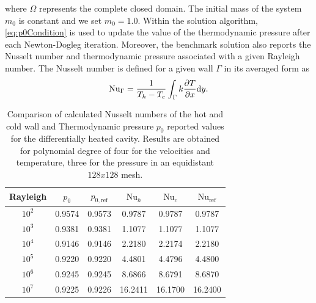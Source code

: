 where $\Omega$ represents the complete closed domain. The initial mass of the system $m_0$ is constant and we set $m_0 = 1.0$. Within the solution algorithm, \cref{eq:p0Condition} is used to update the value of the thermodynamic pressure after each Newton-Dogleg iteration.
Moreover, the benchmark solution \cite{vierendeelsBenchmarkSolutionsNatural2003} also reports the Nusselt number and thermodynamic pressure associated with a given Rayleigh number. The Nusselt number is defined for a given wall $\Gamma$ in its averaged form as 
\begin{equation}\label{eq:Nusselt}
\text{Nu}_\Gamma = \frac{1}{T_h - T_c}\int_{\Gamma} k \frac{\partial T}{\partial x}\text{d}y.
\end{equation}\begin{table}[t]
	\begin{center}
		\begin{tabular}{cccccc}
			\hline
			Rayleigh & $p_0$ &  $p_{0,\text{ref}}$  &$\text{Nu}_{h}$ & $\text{Nu}_{c}$& $\text{Nu}_{\text{ref}}$ \\ \hline
			\parbox[0pt][13pt][c]{0pt}{}$10^2$   & 0.9574 & 0.9573 & 0.9787    & 0.9787 & 0.9787      \\
			$10^3$   & 0.9381 & 0.9381 & 1.1077    & 1.1077  & 1.1077      \\
			$10^4$   & 0.9146 & 0.9146 & 2.2180    & 2.2174  & 2.2180      \\
			$10^5$   & 0.9220 & 0.9220 & 4.4801    & 4.4796   & 4.4800      \\
			$10^6$   & 0.9245 & 0.9245 & 8.6866    & 8.6791  & 8.6870      \\
			$10^7$   & 0.9225 & 0.9226 & 16.2411   & 16.1700 & 16.2400     \\ \hline
		\end{tabular}
	\end{center}
	\caption[Differentially heated cavity: Results of Nusselt number and Thermodynamic pressure]{Comparison of calculated Nusselt numbers of the hot and cold wall and Thermodynamic pressure $p_0$ reported values\cite{vierendeelsBenchmarkSolutionsNatural2003} for the differentially heated cavity. Results are obtained for polynomial degree of four for the velocities and temperature, three for the pressure in an equidistant $128x128$ mesh.}
	\label{tab:p0_Nu_Results}
\end{table}
